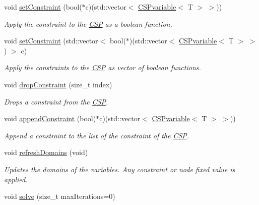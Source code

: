 \begin{DoxyCompactItemize}
void \hyperlink{classCSP_a534a0d9bd10fb544f94196bf3c386657}{setConstraint} (bool($\ast$c)(std::vector$<$ \hyperlink{structCSPvariable}{CSPvariable}$<$ T $>$ $>$))
\begin{DoxyCompactList}\small\item\em Apply the constraint to the \hyperlink{classCSP}{CSP} as a boolean function. \item\end{DoxyCompactList}\item 
void \hyperlink{classCSP_a457e1df05d4ec16be00118bda22fd882}{setConstraint} (std::vector$<$ bool($\ast$)(std::vector$<$ \hyperlink{structCSPvariable}{CSPvariable}$<$ T $>$ $>$) $>$ c)
\begin{DoxyCompactList}\small\item\em Apply the constraints to the \hyperlink{classCSP}{CSP} as vector of boolean functions. \item\end{DoxyCompactList}\item 
void \hyperlink{classCSP_a0231b93bceae257f0e1c35041f8fe63f}{dropConstraint} (size\_\-t index)
\begin{DoxyCompactList}\small\item\em Drops a constraint from the \hyperlink{classCSP}{CSP}. \item\end{DoxyCompactList}\item 
void \hyperlink{classCSP_a8dc6aec6ca7e40d198e58b0ec14fee66}{appendConstraint} (bool($\ast$c)(std::vector$<$ \hyperlink{structCSPvariable}{CSPvariable}$<$ T $>$ $>$))
\begin{DoxyCompactList}\small\item\em Append a constraint to the list of the constraint of the \hyperlink{classCSP}{CSP}. \item\end{DoxyCompactList}\item 
void \hyperlink{classCSP_a466845256e638c5e258fd728b641359f}{refreshDomains} (void)
\begin{DoxyCompactList}\small\item\em Updates the domains of the variables. Any constraint or node fixed value is applied. \item\end{DoxyCompactList}\item 
\hypertarget{classCSP_a7ff61c379081881c21626926bdfd8733}{
void \hyperlink{classCSP_a7ff61c379081881c21626926bdfd8733}{solve} (size\_\-t maxIterations=0)}
\label{classCSP_a7ff61c379081881c21626926bdfd8733}


\end{DoxyCompactItemize}
